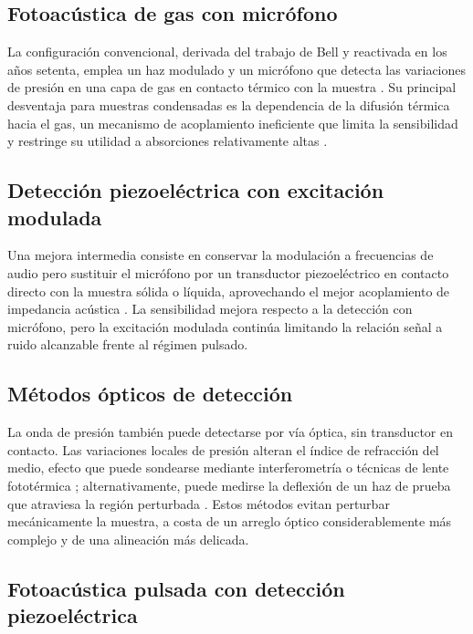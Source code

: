 \subsection*{Fotoacústica de gas con micrófono}

La configuración convencional, derivada del trabajo de Bell y
reactivada en los años setenta, emplea un haz modulado y un
micrófono que detecta las variaciones de presión en una capa de gas
en contacto térmico con la muestra
\cite{RosencwaigGersho1976,PatelTam1981}. Su principal desventaja
para muestras condensadas es la dependencia de la difusión térmica
hacia el gas, un mecanismo de acoplamiento ineficiente que limita
la sensibilidad y restringe su utilidad a absorciones
relativamente altas \cite{PatelTam1981}.

\subsection*{Detección piezoeléctrica con excitación modulada}

Una mejora intermedia consiste en conservar la modulación a
frecuencias de audio pero sustituir el micrófono por un transductor
piezoeléctrico en contacto directo con la muestra sólida o líquida,
aprovechando el mejor acoplamiento de impedancia acústica
\cite{PatelTam1981}. La sensibilidad mejora respecto a la
detección con micrófono, pero la excitación modulada continúa
limitando la relación señal a ruido alcanzable frente al régimen
pulsado.

\subsection*{Métodos ópticos de detección}

La onda de presión también puede detectarse por vía óptica, sin
transductor en contacto. Las variaciones locales de presión alteran
el índice de refracción del medio, efecto que puede sondearse
mediante interferometría o técnicas de lente fototérmica
\cite{Astrath2023}; alternativamente, puede medirse la deflexión de
un haz de prueba que atraviesa la región perturbada \cite{Quan1994}.
Estos métodos evitan perturbar mecánicamente la muestra, a costa de
un arreglo óptico considerablemente más complejo y de una
alineación más delicada.

\subsection*{Fotoacústica pulsada con detección piezoeléctrica}


